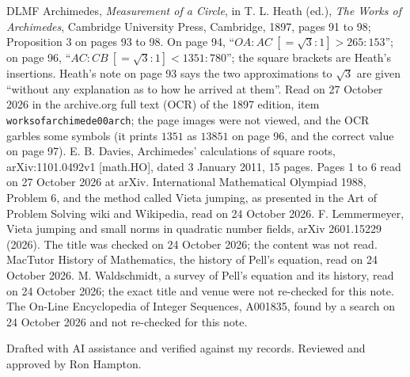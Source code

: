 \documentclass[11pt]{article}
\begin{document}
{\begin{thebibliography}{DLMF}
 Archimedes, \emph{Measurement of a Circle}, in T. L. Heath (ed.), \emph{The Works of Archimedes}, Cambridge University Press, Cambridge, 1897, pages 91 to 98; Proposition 3 on pages 93 to 98. On page 94, ``$OA:AC\ [=\sqrt3:1]>265:153$''; on page 96, ``$AC:CB\ [=\sqrt3:1]<1351:780$''; the square brackets are Heath's insertions. Heath's note on page 93 says the two approximations to $\sqrt3$ are given ``without any explanation as to how he arrived at them''. Read on 27 October 2026 in the archive.org full text (OCR) of the 1897 edition, item \texttt{worksofarchimede00arch}; the page images were not viewed, and the OCR garbles some symbols (it prints $1351$ as $13851$ on page 96, and the correct value on page 97).
 E. B. Davies, Archimedes' calculations of square roots, arXiv:1101.0492v1 [math.HO], dated 3 January 2011, 15 pages. Pages 1 to 6 read on 27 October 2026 at arXiv.
 International Mathematical Olympiad 1988, Problem 6, and the method called Vieta jumping, as presented in the Art of Problem Solving wiki and Wikipedia, read on 24 October 2026.
 F. Lemmermeyer, Vieta jumping and small norms in quadratic number fields, arXiv 2601.15229 (2026). The title was checked on 24 October 2026; the content was not read.
 MacTutor History of Mathematics, the history of Pell's equation, read on 24 October 2026.
 M. Waldschmidt, a survey of Pell's equation and its history, read on 24 October 2026; the exact title and venue were not re-checked for this note.
 The On-Line Encyclopedia of Integer Sequences, A001835, found by a search on 24 October 2026 and not re-checked for this note.
\end{thebibliography}
\par}

\bigskip
\noindent Drafted with AI assistance and verified against my records. Reviewed and approved by Ron Hampton.
\end{document}
